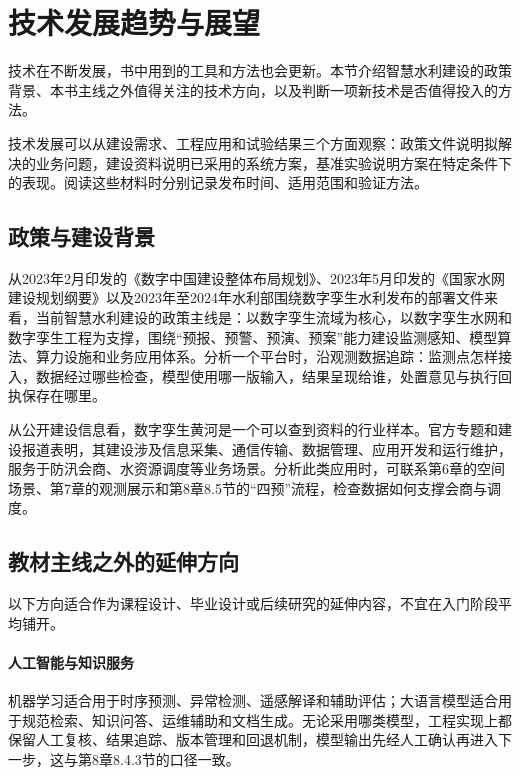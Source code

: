 \section{技术发展趋势与展望}

技术在不断发展，书中用到的工具和方法也会更新。本节介绍智慧水利建设的政策背景、本书主线之外值得关注的技术方向，以及判断一项新技术是否值得投入的方法。

技术发展可以从建设需求、工程应用和试验结果三个方面观察：政策文件说明拟解决的业务问题，建设资料说明已采用的系统方案，基准实验说明方案在特定条件下的表现。阅读这些材料时分别记录发布时间、适用范围和验证方法。

\subsection{政策与建设背景}

从2023年2月印发的《数字中国建设整体布局规划》、2023年5月印发的《国家水网建设规划纲要》以及2023年至2024年水利部围绕数字孪生水利发布的部署文件来看，当前智慧水利建设的政策主线是：以数字孪生流域为核心，以数字孪生水网和数字孪生工程为支撑，围绕“预报、预警、预演、预案”能力建设监测感知、模型算法、算力设施和业务应用体系\cite{digitalChina2023,nationalWaterNetwork2023,twinWater2023,twinProject2024}。分析一个平台时，沿观测数据追踪：监测点怎样接入，数据经过哪些检查，模型使用哪一版输入，结果呈现给谁，处置意见与执行回执保存在哪里。

从公开建设信息看，数字孪生黄河是一个可以查到资料的行业样本。官方专题和建设报道表明，其建设涉及信息采集、通信传输、数据管理、应用开发和运行维护，服务于防汛会商、水资源调度等业务场景\cite{twinYellowRiver2024,twinYellowRiverInfo2024}。分析此类应用时，可联系第6章的空间场景、第7章的观测展示和第8章8.5节的“四预”流程，检查数据如何支撑会商与调度。

\subsection{教材主线之外的延伸方向}

以下方向适合作为课程设计、毕业设计或后续研究的延伸内容，不宜在入门阶段平均铺开。

\paragraph{人工智能与知识服务}机器学习适合用于时序预测、异常检测、遥感解译和辅助评估；大语言模型适合用于规范检索、知识问答、运维辅助和文档生成。无论采用哪类模型，工程实现上都保留人工复核、结果追踪、版本管理和回退机制，模型输出先经人工确认再进入下一步，这与第8章8.4.3节的口径一致。

